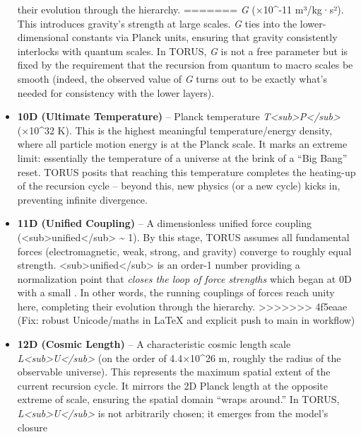 \documentclass[]{article}
\begin{document}
\begin{itemize}
  their evolution through the hierarchy\hspace{0pt}.
=======
  \emph{G} (×10\^{}-11 m³/kg·s²)​. This introduces gravity's
  strength at large scales. \emph{G} ties into the lower-dimensional
  constants via Planck units, ensuring that gravity consistently
  interlocks with quantum scales​. In TORUS, \emph{G} is not a free
  parameter but is fixed by the requirement that the recursion from
  quantum to macro scales be smooth (indeed, the observed value of
  \emph{G} turns out to be exactly what's needed for consistency with
  the lower layers)​.
\item
  \textbf{10D (Ultimate Temperature)} -- Planck temperature
  \emph{T\textless{}sub\textgreater{}P\textless{}/sub\textgreater{}} (×10\^{}32 K)​. This is the highest meaningful temperature/energy
  density, where all particle motion energy is at the Planck scale. It
  marks an extreme limit: essentially the temperature of a universe at
  the brink of a ``Big Bang'' reset. TORUS posits that reaching this
  temperature completes the heating-up of the recursion cycle​ -- beyond
  this, new physics (or a new cycle) kicks in, preventing infinite
  divergence.
\item
  \textbf{11D (Unified Coupling)} -- A dimensionless unified force
  coupling
  (\alpha\textless{}sub\textgreater{}unified\textless{}/sub\textgreater{}
  \textasciitilde{} 1)​. By this stage, TORUS assumes all fundamental
  forces (electromagnetic, weak, strong, and gravity) converge to
  roughly equal strength.
  \alpha\textless{}sub\textgreater{}unified\textless{}/sub\textgreater{} is
  an order-1 number providing a normalization point that \emph{closes
  the loop of force strengths} which began at 0D with a small \alpha. In
  other words, the running couplings of forces reach unity here,
  completing their evolution through the hierarchy​.
>>>>>>> 4f5eaae (Fix: robust Unicode/maths in LaTeX and explicit push to main in workflow)
\item
  \textbf{12D (Cosmic Length)} -- A characteristic cosmic length scale
  \emph{L\textless{}sub\textgreater{}U\textless{}/sub\textgreater{}} (on
  the order of 4.4×10\^{}26 m, roughly the radius of the observable
  universe)​. This represents the maximum spatial extent of the current
  recursion cycle. It mirrors the 2D Planck length at the opposite
  extreme of scale, ensuring the spatial domain ``wraps around.'' In
  TORUS,
  \emph{L\textless{}sub\textgreater{}U\textless{}/sub\textgreater{}} is
  not arbitrarily chosen; it emerges from the model's closure

\end{itemize}
\end{document}
